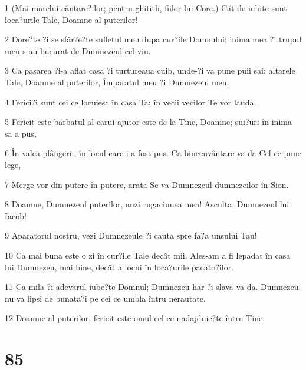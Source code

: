 \par 1 (Mai-marelui cântare?ilor; pentru ghitith, fiilor lui Core.) Cât de iubite sunt loca?urile Tale, Doamne al puterilor!
\par 2 Dore?te ?i se sfâr?e?te sufletul meu dupa cur?ile Domnului; inima mea ?i trupul meu s-au bucurat de Dumnezeul cel viu.
\par 3 Ca pasarea ?i-a aflat casa ?i turtureaua cuib, unde-?i va pune puii sai: altarele Tale, Doamne al puterilor, Împaratul meu ?i Dumnezeul meu.
\par 4 Ferici?i sunt cei ce locuiesc în casa Ta; în vecii vecilor Te vor lauda.
\par 5 Fericit este barbatul al carui ajutor este de la Tine, Doamne; sui?uri în inima sa a pus,
\par 6 În valea plângerii, în locul care i-a fost pus. Ca binecuvântare va da Cel ce pune lege,
\par 7 Merge-vor din putere în putere, arata-Se-va Dumnezeul dumnezeilor în Sion.
\par 8 Doamne, Dumnezeul puterilor, auzi rugaciunea mea! Asculta, Dumnezeul lui Iacob!
\par 9 Aparatorul nostru, vezi Dumnezeule ?i cauta spre fa?a unsului Tau!
\par 10 Ca mai buna este o zi în cur?ile Tale decât mii. Ales-am a fi lepadat în casa lui Dumnezeu, mai bine, decât a locui în loca?urile pacato?ilor.
\par 11 Ca mila ?i adevarul iube?te Domnul; Dumnezeu har ?i slava va da. Dumnezeu nu va lipsi de bunata?i pe cei ce umbla întru nerautate.
\par 12 Doamne al puterilor, fericit este omul cel ce nadajduie?te întru Tine.

\chapter{85}

